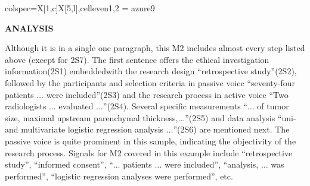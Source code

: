 \documentclass[a4paper]{ctexbook}
\begin{document}
\begin{sample}[label={myautocounter}]{\heiti}
{\begin{tblr}{colspec={X[1,c]X[5,l]},cell{even}{1,2} = {azure9}}
    \bottomrule
  \end{tblr}
  }

  \noindent \textbf{ANALYSIS}

  Although it is in a single one paragraph, this M2 includes almost every step listed above (except for 2S7). The first sentence offers the ethical investigation information(2S1) embeddedwith the research design ``retrospective study''(2S2), followed by the participants and selection criteria in passive voice ``seventy-four patients $\dots$ were included''(2S3) and the research process in active voice ``Two radiologists $\dots$ evaluated $\dots$''(2S4). Several specific measurements ``$\dots$ of tumor size, maximal upstream parenchymal thickness,$\dots$''(2S5) and data analysis ``uni-and multivariate logistic regression analysis $\dots$''(2S6) are mentioned next. The passive voice is quite prominent in this sample, indicating the objectivity of the research process. Signals for M2 covered in this example include ``retrospective study'', ``informed consent'', ``$\dots$ patients $\dots$ were included'', ``analysis, $\dots$ was performed'', ``logistic regression analyses were performed'', etc.

\end{sample}
\end{document}
